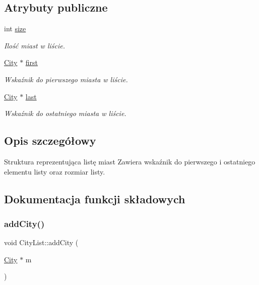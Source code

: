 \subsection*{Atrybuty publiczne}
\begin{DoxyCompactItemize}
\item 
int \mbox{\hyperlink{struct_city_list_a7f2a7190a909510150705a1b1be9e101}{size}}
\begin{DoxyCompactList}\small\item\em Ilość miast w liście. \end{DoxyCompactList}\item 
\mbox{\hyperlink{struct_city}{City}} $\ast$ \mbox{\hyperlink{struct_city_list_ac1a011a48ce943c37ba9464f74670849}{first}}
\begin{DoxyCompactList}\small\item\em Wskaźnik do pierwszego miasta w liście. \end{DoxyCompactList}\item 
\mbox{\hyperlink{struct_city}{City}} $\ast$ \mbox{\hyperlink{struct_city_list_a924d5ffe21353b51e6114d0eddaf3fed}{last}}
\begin{DoxyCompactList}\small\item\em Wskaźnik do ostatniego miasta w liście. \end{DoxyCompactList}\end{DoxyCompactItemize}


\subsection{Opis szczegółowy}
Struktura reprezentująca listę miast Zawiera wskaźnik do pierwszego i ostatniego elementu listy oraz rozmiar listy. 

\subsection{Dokumentacja funkcji składowych}
\mbox{\label{struct_city_list_a6da84a7b2fadd94a3f361171beca61fd}} 
\subsubsection{\texorpdfstring{addCity()}{addCity()}}
{\footnotesize\ttfamily void City\+List\+::add\+City (\begin{DoxyParamCaption}\item[{\mbox{\hyperlink{struct_city}{City}} $\ast$}]{m }\end{DoxyParamCaption})}



